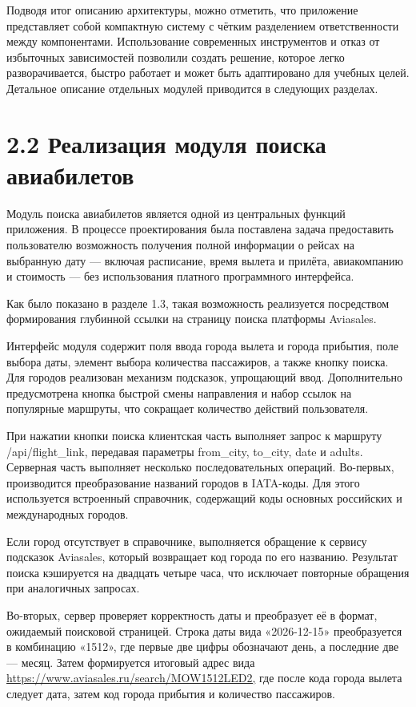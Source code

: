 \documentclass[14pt,a4paper,oneside]{extreport}
\begin{document}
Подводя итог описанию архитектуры, можно отметить, что приложение представляет собой компактную систему с чётким разделением ответственности между компонентами. Использование современных инструментов и отказ от избыточных зависимостей позволили создать решение, которое легко разворачивается, быстро работает и может быть адаптировано для учебных целей. Детальное описание отдельных модулей приводится в следующих разделах.


\section*{2.2 Реализация модуля поиска авиабилетов}

Модуль поиска авиабилетов является одной из центральных функций приложения. В процессе проектирования была поставлена задача предоставить пользователю возможность получения полной информации о рейсах на выбранную дату — включая расписание, время вылета и прилёта, авиакомпанию и стоимость — без использования платного программного интерфейса.

Как было показано в разделе 1.3, такая возможность реализуется посредством формирования глубинной ссылки на страницу поиска платформы Aviasales.

Интерфейс модуля содержит поля ввода города вылета и города прибытия, поле выбора даты, элемент выбора количества пассажиров, а также кнопку поиска. Для городов реализован механизм подсказок, упрощающий ввод. Дополнительно предусмотрена кнопка быстрой смены направления и набор ссылок на популярные маршруты, что сокращает количество действий пользователя.

При нажатии кнопки поиска клиентская часть выполняет запрос к маршруту /api/flight\_link, передавая параметры from\_city, to\_city, date и adults. Серверная часть выполняет несколько последовательных операций. Во-первых, производится преобразование названий городов в IATA-коды. Для этого используется встроенный справочник, содержащий коды основных российских и международных городов.

Если город отсутствует в справочнике, выполняется обращение к сервису подсказок Aviasales, который возвращает код города по его названию. Результат поиска кэшируется на двадцать четыре часа, что исключает повторные обращения при аналогичных запросах.

Во-вторых, сервер проверяет корректность даты и преобразует её в формат, ожидаемый поисковой страницей. Строка даты вида «2026-12-15» преобразуется в комбинацию «1512», где первые две цифры обозначают день, а последние две — месяц. Затем формируется итоговый адрес вида \url{https://www.aviasales.ru/search/MOW1512LED2,} где после кода города вылета следует дата, затем код города прибытия и количество пассажиров.
\end{document}
